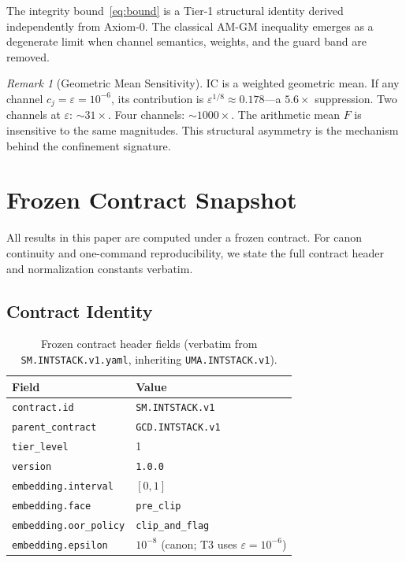 \documentclass[11pt,a4paper]{article}
\theoremstyle{plain}
\theoremstyle{definition}
\theoremstyle{remark}
\newtheorem{remark}{Remark}
\newcommand{\eps}{\varepsilon}
\newcommand{\IC}{\mathrm{IC}}
\begin{document}
The integrity bound~\eqref{eq:bound} is a Tier-1 structural
identity derived independently from Axiom-0.  The classical
AM-GM inequality emerges as a degenerate limit when channel
semantics, weights, and the guard band are removed.

\begin{remark}[Geometric Mean Sensitivity]\label{rem:sensitivity}
$\IC$ is a weighted geometric mean.  If any channel
$c_j = \eps = 10^{-6}$, its contribution is
$\eps^{1/8} \approx 0.178$---a $5.6\times$ suppression.
Two channels at $\eps$: $\sim 31\times$.
Four channels: $\sim 1000\times$.
The arithmetic mean $F$ is insensitive to the same magnitudes.
This structural asymmetry is the mechanism behind the
confinement signature.
\end{remark}


\section{Frozen Contract Snapshot}\label{sec:contract}

All results in this paper are computed under a frozen contract.
For canon continuity and one-command reproducibility, we state
the full contract header and normalization constants verbatim.

\subsection{Contract Identity}

\begin{table}[H]
\caption{Frozen contract header fields (verbatim from
\texttt{SM.INTSTACK.v1.yaml}, inheriting
\texttt{UMA.INTSTACK.v1}).}
\label{tab:contract}
\centering\small
\begin{tabular}{@{}ll@{}}
\toprule
\textbf{Field} & \textbf{Value} \\
\midrule
\texttt{contract.id}        & \texttt{SM.INTSTACK.v1} \\
\texttt{parent\_contract}    & \texttt{GCD.INTSTACK.v1} \\
\texttt{tier\_level}         & 1 \\
\texttt{version}             & \texttt{1.0.0} \\
\texttt{embedding.interval}  & $[0, 1]$ \\
\texttt{embedding.face}      & \texttt{pre\_clip} \\
\texttt{embedding.oor\_policy} & \texttt{clip\_and\_flag} \\
\texttt{embedding.epsilon}   & $10^{-8}$ (canon; T3 uses $\eps = 10^{-6}$) \\
\bottomrule
\end{tabular}
\end{table}
\end{document}
